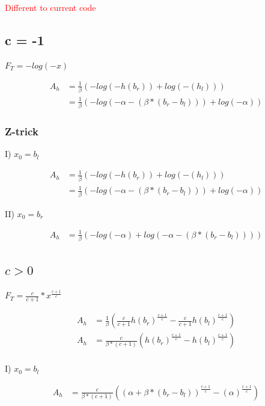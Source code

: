 \documentclass[]{article}
\begin{document}
\textcolor{red}{Different to current code}

\subsection{c = -1}

$F_T = - log(-x)$

\begin{align*}
A_h &= \frac{1}{\beta} \left(-log(-h(b_r)) + log(-(h_l)) \right) \\
&= \frac{1}{\beta} \left(-log(-\alpha - (\beta * (b_r - b_l))) + log(-\alpha) \right)
\end{align*}

\subsubsection{Z-trick}

I) $x_0 = b_l$

\begin{align*}
A_h &= \frac{1}{\beta} \left(-log(-h(b_r)) + log(-(h_l)) \right) \\
&= \frac{1}{\beta} \left(-log(-\alpha - (\beta * (b_r - b_l))) + log(-\alpha) \right)
\end{align*}

II) $x_0 = b_r$

\begin{align*}
A_h &= \frac{1}{\beta} \left(- log(-\alpha) + log(-\alpha - (\beta * (b_r - b_l))) \right)
\end{align*}

\subsection{$c > 0$}

$F_T = \frac{c}{c + 1} * x^{\frac{c + 1}{c}}$

\begin{align*}
A_h &= \frac{1}{\beta} \left( \frac{c}{c + 1} h(b_r)^{\frac{c + 1}{c}} - \frac{c}{c + 1} h(b_l)^{\frac{c + 1}{c}} \right) \\
A_h &= \frac{c}{\beta * (c + 1)}  \left( h(b_r)^{\frac{c + 1}{c}} - h(b_l)^{\frac{c + 1}{c}} \right) \\
\end{align*}

I) $x_0 = b_l$

\begin{align*}
A_h &= \frac{c}{\beta * (c + 1)}  \left( (\alpha + \beta * (b_r - b_l))^{\frac{c + 1}{c}} - (\alpha)^{\frac{c + 1}{c}} \right) \\
\end{align*}
\end{document}
